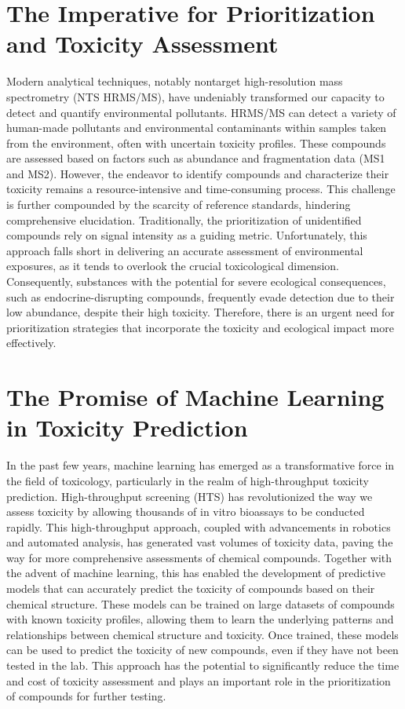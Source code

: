 \section{The Imperative for Prioritization and Toxicity Assessment}

Modern analytical techniques, notably nontarget high-resolution mass spectrometry (NTS HRMS/MS), have undeniably transformed our capacity to detect and quantify environmental pollutants. HRMS/MS can detect a variety of human-made pollutants and environmental contaminants within samples taken from the environment, often with uncertain toxicity profiles. These compounds are assessed based on factors such as abundance and fragmentation data (MS1 and MS2). However, the endeavor to identify compounds and characterize their toxicity remains a resource-intensive and time-consuming process. This challenge is further compounded by the scarcity of reference standards, hindering comprehensive elucidation. Traditionally, the prioritization of unidentified compounds rely on signal intensity as a guiding metric. Unfortunately, this approach falls short in delivering an accurate assessment of environmental exposures, as it tends to overlook the crucial toxicological dimension. Consequently, substances with the potential for severe ecological consequences, such as endocrine-disrupting compounds, frequently evade detection due to their low abundance, despite their high toxicity. Therefore, there is an urgent need for prioritization strategies that incorporate the toxicity and ecological impact more effectively.

\section{The Promise of Machine Learning in Toxicity Prediction}

In the past few years, machine learning has emerged as a transformative force in the field of toxicology, particularly in the realm of high-throughput toxicity prediction. High-throughput screening (HTS) has revolutionized the way we assess toxicity by allowing thousands of in vitro bioassays to be conducted rapidly. This high-throughput approach, coupled with advancements in robotics and automated analysis, has generated vast volumes of toxicity data, paving the way for more comprehensive assessments of chemical compounds.
Together with the advent of machine learning, this has enabled the development of predictive models that can accurately predict the toxicity of compounds based on their chemical structure. These models can be trained on large datasets of compounds with known toxicity profiles, allowing them to learn the underlying patterns and relationships between chemical structure and toxicity. Once trained, these models can be used to predict the toxicity of new compounds, even if they have not been tested in the lab. This approach has the potential to significantly reduce the time and cost of toxicity assessment and plays an important role in the prioritization of compounds for further testing.

